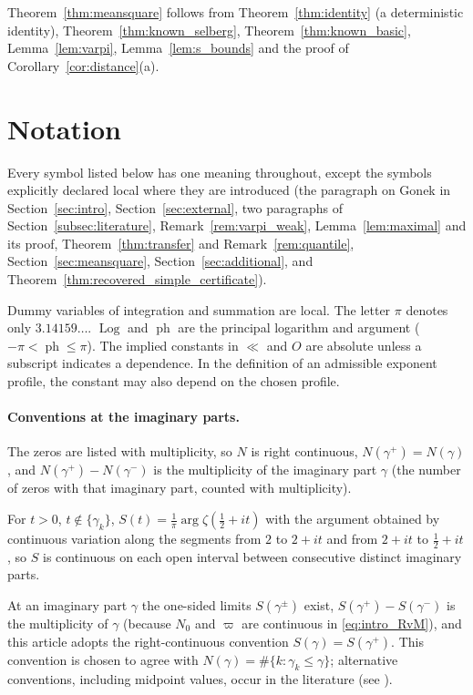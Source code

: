 \documentclass[11pt,a4paper]{article}
\makeatletter
\numberwithin{equation}{section}
\DeclareRobustCommand{\CGref}[1]{\ref{#1}}
\DeclareRobustCommand{\CGeqref}[1]{\eqref{#1}}
\DeclareRobustCommand{\CGcite}[2][]{\if\relax\detokenize{#1}\relax\cite{#2}\else\cite[#1]{#2}\fi}
\let\CG@origref\ref
\let\CG@origeqref\eqref
\newcommand{\CG@gettip}[1]{\@ifundefined{CGTip@#1}{#1}{\csname CGTip@#1\endcsname}}
\newcommand{\CG@getbib}[1]{\@ifundefined{CGBib@#1}{#1}{\csname CGBib@#1\endcsname}}
\DeclareRobustCommand{\CGref}[1]{\pdftooltip{\CG@origref{#1}}{\CG@gettip{#1}}}
\DeclareRobustCommand{\CGeqref}[1]{\pdftooltip{\CG@origeqref{#1}}{\CG@gettip{#1}}}
\DeclareRobustCommand{\CGcite}[2][]{\pdftooltip{\if\relax\detokenize{#1}\relax\cite{#2}\else\cite[#1]{#2}\fi}{\CG@getbib{#2}}}
\theoremstyle{definition}
\theoremstyle{remark}
\newcommand{\Nz}{N_0} %
\makeatother
\begin{document}
Theorem~\CGref{thm:meansquare} follows from Theorem~\CGref{thm:identity} (a deterministic identity), Theorem~\CGref{thm:known_selberg}, Theorem~\CGref{thm:known_basic}, Lemma~\CGref{lem:varpi}, Lemma~\CGref{lem:s_bounds} and the proof of Corollary~\CGref{cor:distance}(a).

\section{Notation}\label{sec:notation}

Every symbol listed below has one meaning throughout, except the symbols explicitly declared local where they are introduced (the paragraph on Gonek in Section~\CGref{sec:intro}, Section~\CGref{sec:external}, two paragraphs of Section~\CGref{subsec:literature}, Remark~\CGref{rem:varpi_weak}, Lemma~\CGref{lem:maximal} and its proof, Theorem~\CGref{thm:transfer} and Remark~\CGref{rem:quantile}, Section~\CGref{sec:meansquare}, Section~\CGref{sec:additional}, and Theorem~\CGref{thm:recovered_simple_certificate}).

Dummy variables of integration and summation are local. The letter $\pi$ denotes only $3.14159\ldots$. $\operatorname{Log}$ and $\operatorname{ph}$ are the principal logarithm and argument ($-\pi<\operatorname{ph}\le\pi$). The implied constants in $\ll$ and $O$ are absolute unless a subscript indicates a dependence. In the definition of an admissible exponent profile, the constant may also depend on the chosen profile.

\paragraph{Conventions at the imaginary parts.}
The zeros are listed with multiplicity, so $N$ is right continuous, $N(\gamma^+)=N(\gamma)$, and $N(\gamma^+)-N(\gamma^-)$ is the multiplicity of the imaginary part $\gamma$ (the number of zeros with that imaginary part, counted with multiplicity).

For $t>0$, $t\notin\{\gamma_k\}$, $S(t)=\frac1\pi\arg\zeta(\frac12+it)$ with the argument obtained by continuous variation along the segments from $2$ to $2+it$ and from $2+it$ to $\frac12+it$, so $S$ is continuous on each open interval between consecutive distinct imaginary parts.

At an imaginary part $\gamma$ the one-sided limits $S(\gamma^\pm)$ exist, $S(\gamma^+)-S(\gamma^-)$ is the multiplicity of $\gamma$ (because $\Nz$ and $\varpi$ are continuous in \CGeqref{eq:intro_RvM}), and this article adopts the right-continuous convention $S(\gamma)=S(\gamma^+)$. This convention is chosen to agree with $N(\gamma)=\#\{k:\gamma_k\le\gamma\}$; alternative conventions, including midpoint values, occur in the literature (see \CGcite[\S9.3]{Titchmarsh1986}).
\end{document}
